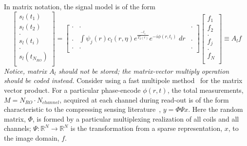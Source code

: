 \documentclass[10pt]{amsart}
\begin{document}
In matrix notation, the signal model is of the form
\[
\begin{bmatrix}
s_l(t_1) \\
s_l(t_2) \\
    .    \\
s_l(t_i) \\
    .    \\
s_l(t_{N_{RO}}) \\
\end{bmatrix}
 = 
\begin{bmatrix}
. & . & . \\
. & \int \psi_j(r) c_l(r,\eta)  e^{\frac{-t_i}{T_2^*(r)}} e^{-i\phi(r,t_i)} \; dr & . \\
. & . & . \\
\end{bmatrix}
\begin{bmatrix}
f_1 \\
f_2 \\
  . \\
f_j \\
  . \\
f_N \\
\end{bmatrix}
\equiv
A_l f
\]
{\color{red}
\textit{Notice, matrix $A_l$ should not be stored; the matrix-vector
multiply operation should be coded instead.}
Consider using a fast multipole method~\cite{Liu2009a,Greengard1997} 
for the matrix vector product.
}
For a particular phase-encode $\phi(r,t)$,
the total measurements, $M = N_{RO} \cdot N_{channel}$,
 acquired at each channel 
during read-out is of the form characteristic
to the compressing sensing literature~\cite{baraniuk2010model},
$y = \Phi \Psi x$. Here the random matrix, $\Phi$, is formed
by a particular multiplexing realization of all coils
and all channels; $\Psi : \mathbb{R}^N \rightarrow \mathbb{R}^N$
is the transformation from a sparse representation, $x$, to the image domain, $f$.
\end{document}
